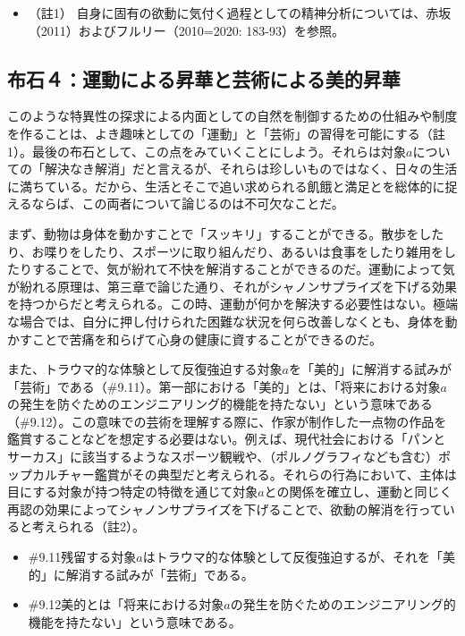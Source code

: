 \begin{itemize}
\tightlist
\item
  （註1）
  自身に固有の欲動に気付く過程としての精神分析については、赤坂（2011）\cite{Akasaka}およびフルリー（2010=2020:
  183-93）\cite{Floury}を参照。
\end{itemize}

\subsection{布石４：運動による昇華と芸術による美的昇華}\label{ux5e03ux77f3uxff14ux904bux52d5ux306bux3088ux308bux6607ux83efux3068ux82b8ux8853ux306bux3088ux308bux7f8eux7684ux6607ux83ef}

このような特異性の探求による内面としての自然を制御するための仕組みや制度を作ることは、よき趣味としての「運動」と「芸術」の習得を可能にする（註1）。最後の布石として、この点をみていくことにしよう。それらは対象\(a\)についての「解決なき解消」だと言えるが、それらは珍しいものではなく、日々の生活に満ちている。だから、生活とそこで追い求められる飢餓と満足とを総体的に捉えるならば、この両者について論じるのは不可欠なことだ。

まず、動物は身体を動かすことで「スッキリ」することができる。散歩をしたり、お喋りをしたり、スポーツに取り組んだり、あるいは食事をしたり雑用をしたりすることで、気が紛れて不快を解消することができるのだ。運動によって気が紛れる原理は、第三章で論じた通り、それがシャノンサプライズを下げる効果を持つからだと考えられる。この時、運動が何かを解決する必要性はない。極端な場合では、自分に押し付けられた困難な状況を何ら改善しなくとも、身体を動かすことで苦痛を和らげて心身の健康に資することができるのだ。

また、トラウマ的な体験として反復強迫する対象\(a\)を「美的」に解消する試みが「芸術」である（\#9.11）。第一部における「美的」とは、「将来における対象\(a\)の発生を防ぐためのエンジニアリング的機能を持たない」という意味である（\#9.12）。この意味での芸術を理解する際に、作家が制作した一点物の作品を鑑賞することなどを想定する必要はない。例えば、現代社会における「パンとサーカス」に該当するようなスポーツ観戦や、（ポルノグラフィなども含む）ポップカルチャー鑑賞がその典型だと考えられる。それらの行為において、主体は目にする対象が持つ特定の特徴を通じて対象\(a\)との関係を確立し、運動と同じく再認の効果によってシャノンサプライズを下げることで、欲動の解消を行っていると考えられる（註2）。

\begin{note}{}
  \begin{itemize}
    \tightlist
    \item{\#9.11}残留する対象$a$はトラウマ的な体験として反復強迫するが、それを「美的」に解消する試みが「芸術」である。
    \item{\#9.12}美的とは「将来における対象$a$の発生を防ぐためのエンジニアリング的機能を持たない」という意味である。
  \end{itemize}
\end{note}

